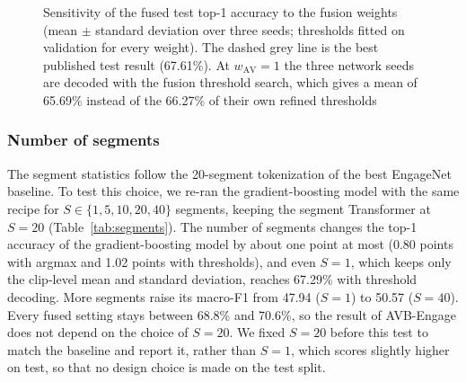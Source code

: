 \documentclass[pdflatex,iicol,sn-basic]{sn-jnl}
\newcommand{\ournet}{AVB-Engage}
\begin{document}
\begin{figure}[t]
\centering
{}
\caption{Sensitivity of the fused test top-1 accuracy to the fusion weights (mean $\pm$ standard deviation over three seeds; thresholds fitted on validation for every weight). The dashed grey line is the best published test result (67.61\%). At $w_{\mathrm{AV}} = 1$ the three network seeds are decoded with the fusion threshold search, which gives a mean of 65.69\% instead of the 66.27\% of their own refined thresholds}
\label{fig:sensitivity}
\end{figure}

\subsubsection{Number of segments}\label{sec:abl_segments}

The segment statistics follow the 20-segment tokenization of the best EngageNet baseline. To test this choice, we re-ran the gradient-boosting model with the same recipe for $S \in \{1, 5, 10, 20, 40\}$ segments, keeping the segment Transformer at $S = 20$ (Table~\ref{tab:segments}). The number of segments changes the top-1 accuracy of the gradient-boosting model by about one point at most (0.80 points with argmax and 1.02 points with thresholds), and even $S = 1$, which keeps only the clip-level mean and standard deviation, reaches 67.29\% with threshold decoding. More segments raise its macro-F1 from 47.94 ($S = 1$) to 50.57 ($S = 40$). Every fused setting stays between 68.8\% and 70.6\%, so the result of \ournet{} does not depend on the choice of $S = 20$. We fixed $S = 20$ before this test to match the baseline and report it, rather than $S = 1$, which scores slightly higher on test, so that no design choice is made on the test split.
\end{document}

